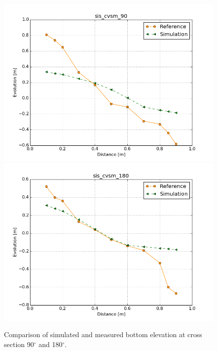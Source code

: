 \begin{figure} [!h]
\centering
\includegraphics[width=.96\textwidth]{sis_cvsm_90.png}
\includegraphics[width=.96\textwidth]{sis_cvsm_180.png}
 \caption{Comparison of simulated and measured bottom elevation at cross section 90$^{\circ}$ and 180$^{\circ}$.}\label{fig:results2}
\end{figure}

